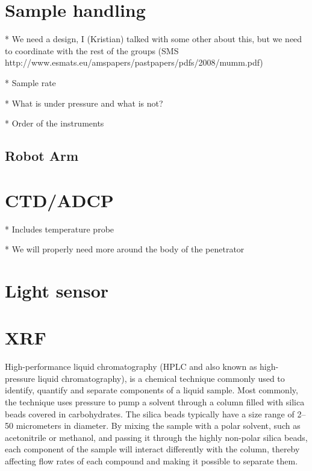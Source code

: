 \section{Sample handling}

* We need a design, I (Kristian) talked with some other about this, but we need to coordinate with the rest of the groups
   (SMS http://www.esmats.eu/amspapers/pastpapers/pdfs/2008/mumm.pdf)

* Sample rate

* What is under pressure and what is not?

* Order of the instruments

\subsection{Robot Arm} %


\section{CTD/ADCP}

* Includes temperature probe

    * We will properly need more around the body of the penetrator

\section{Light sensor}



\section{XRF}

\label{sec:hplc}
High-performance liquid chromatography (HPLC and also known as high-pressure liquid chromatography), is a chemical technique commonly used to identify, quantify and separate components of a liquid sample. Most commonly, the technique uses pressure to pump a solvent through a column filled with silica beads covered in carbohydrates. The silica beads typically have a size range of 2–50 micrometers in diameter. By mixing the sample with a polar solvent, such as acetonitrile or methanol, and passing it through the highly non-polar silica beads, each component of the sample will interact differently with the column, thereby affecting flow rates of each compound and making it possible to separate them. \cite{wiki_hplc}

